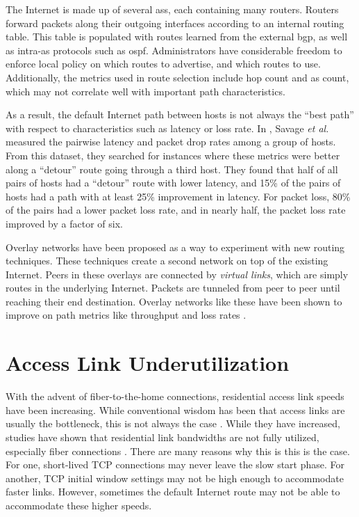 \documentclass{cwru}
\begin{document}
The Internet is made up of several \acp{as}, each containing many routers.
Routers forward packets along their outgoing interfaces according to an internal
routing table. This table is populated with routes learned from the external
\ac{bgp}, as well as intra-\acs{as} protocols such as \ac{ospf}. Administrators
have considerable freedom to enforce local policy on which routes to advertise,
and which routes to use. Additionally, the metrics used in route selection
include hop count and \ac{as} count, which may not correlate well with important
path characteristics.

As a result, the default Internet path between hosts is not always the ``best
path'' with respect to characteristics such as latency or loss rate. In
\cite{detour}, Savage \textit{et al.} measured the pairwise latency and packet
drop rates among a group of hosts. From this dataset, they searched for
instances where these metrics were better along a ``detour'' route going through
a third host. They found that half of all pairs of hosts had a ``detour'' route
with lower latency, and 15\% of the pairs of hosts had a path with at least 25\%
improvement in latency. For packet loss, 80\% of the pairs had a lower packet
loss rate, and in nearly half, the packet loss rate improved by a factor of six.

Overlay networks have been proposed as a way to experiment with new routing
techniques. These techniques create a second network on top of the existing
Internet. Peers in these overlays are connected by \textit{virtual links}, which
are simply routes in the underlying Internet. Packets are tunneled from peer to
peer until reaching their end destination. Overlay networks like these have been
shown to improve on path metrics like throughput and loss rates
\cite{detour,ron}.

\section{Access Link Underutilization}

With the advent of fiber-to-the-home connections, residential access link speeds
have been increasing. While conventional wisdom has been that access links are
usually the bottleneck, this is not always the case \cite{akella2003empirical}.
While they have increased, studies have shown that residential link bandwidths
are not fully utilized, especially fiber connections \cite{fibertothehome}.
There are many reasons why this is this is the case. For one, short-lived TCP
connections may never leave the slow start phase. For another, TCP initial
window settings may not be high enough to accommodate faster links. However,
sometimes the default Internet route may not be able to accommodate these higher
speeds.
\end{document}
